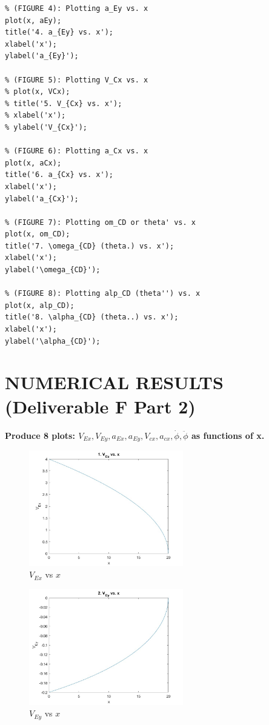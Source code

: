 \documentclass[12pt, a4paper]{article}
\begin{document}
\begin{lstlisting}
% (FIGURE 4): Plotting a_Ey vs. x
plot(x, aEy);
title('4. a_{Ey} vs. x');
xlabel('x');
ylabel('a_{Ey}');

% (FIGURE 5): Plotting V_Cx vs. x
% plot(x, VCx);
% title('5. V_{Cx} vs. x');
% xlabel('x');
% ylabel('V_{Cx}');

% (FIGURE 6): Plotting a_Cx vs. x
plot(x, aCx);
title('6. a_{Cx} vs. x');
xlabel('x');
ylabel('a_{Cx}');

% (FIGURE 7): Plotting om_CD or theta' vs. x
plot(x, om_CD);
title('7. \omega_{CD} (theta.) vs. x');
xlabel('x');
ylabel('\omega_{CD}');

% (FIGURE 8): Plotting alp_CD (theta'') vs. x
plot(x, alp_CD);
title('8. \alpha_{CD} (theta..) vs. x');
xlabel('x');
ylabel('\alpha_{CD}');
\end{lstlisting}

\FloatBarrier

\newpage
\section{NUMERICAL RESULTS (Deliverable F Part 2)}

\textbf{Produce 8 plots: $V_{Ex}, V_{Ey}, a_{Ex}, a_{Ey}, V_{cx}, a_{cx}, \dot\phi, \ddot\phi$ as functions of x.}

\begin{figure}[htbp]
    \centering
    \includegraphics[width=0.6\textwidth]{graph1.jpg}
    \caption{$V_{Ex}$ vs $x$}
    \label{fig:label2}
\end{figure}

\FloatBarrier

\begin{figure}[htbp]
    \centering
    \includegraphics[width=0.6\textwidth]{graph2.jpg}
    \caption{$V_{Ey}$ vs $x$}
    \label{fig:label2}
\end{figure}
\end{document}
